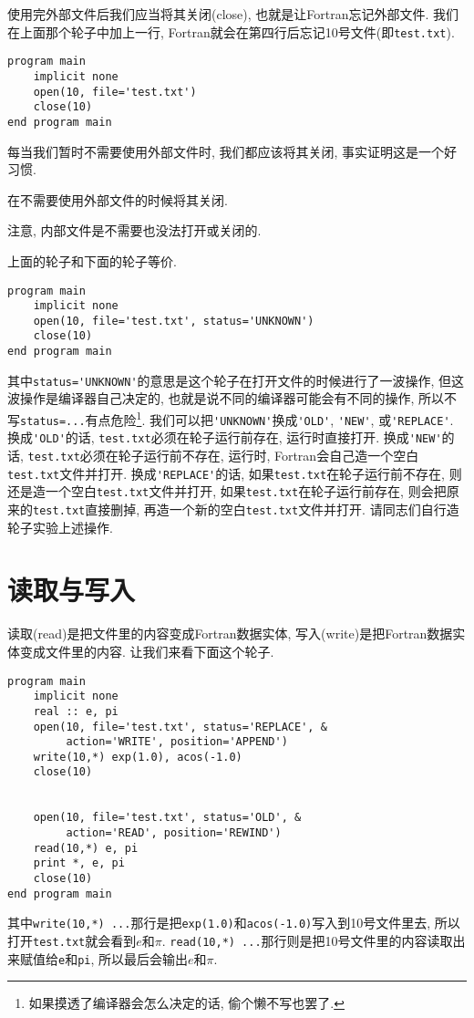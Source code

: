 使用完外部文件后我们应当将其关闭(close), 也就是让Fortran忘记外部文件. 我们在上面那个轮子中加上一行, Fortran就会在第四行后忘记10号文件(即\verb|test.txt|).
\begin{verbatim}
program main
    implicit none
    open(10, file='test.txt')
    close(10)
end program main
\end{verbatim}

每当我们暂时不需要使用外部文件时, 我们都应该将其关闭, 事实证明这是一个好习惯.

\begin{principle}
    在不需要使用外部文件的时候将其关闭.
\end{principle}

注意, 内部文件是不需要也没法打开或关闭的.

上面的轮子和下面的轮子等价.
\begin{verbatim}
program main
    implicit none
    open(10, file='test.txt', status='UNKNOWN')
    close(10)
end program main
\end{verbatim}
其中\verb|status='UNKNOWN'|的意思是这个轮子在打开文件的时候进行了一波操作, 但这波操作是编译器自己决定的, 也就是说不同的编译器可能会有不同的操作, 所以不写\verb|status=...|有点危险\footnote{如果摸透了编译器会怎么决定的话, 偷个懒不写也罢了.\label{no_add}}. 我们可以把\verb|'UNKNOWN'|换成\verb|'OLD'|, \verb|'NEW'|, 或\verb|'REPLACE'|. 换成\verb|'OLD'|的话, \verb|test.txt|必须在轮子运行前存在, 运行时直接打开. 换成\verb|'NEW'|的话, \verb|test.txt|必须在轮子运行前不存在, 运行时, Fortran会自己造一个空白\verb|test.txt|文件并打开. 换成\verb|'REPLACE'|的话, 如果\verb|test.txt|在轮子运行前不存在, 则还是造一个空白\verb|test.txt|文件并打开, 如果\verb|test.txt|在轮子运行前存在, 则会把原来的\verb|test.txt|直接删掉, 再造一个新的空白\verb|test.txt|文件并打开. 请同志们自行造轮子实验上述操作.

\section{读取与写入}

读取(read)是把文件里的内容变成Fortran数据实体, 写入(write)是把Fortran数据实体变成文件里的内容. 让我们来看下面这个轮子.
\begin{verbatim}
program main
    implicit none
    real :: e, pi
    open(10, file='test.txt', status='REPLACE', &
         action='WRITE', position='APPEND')
    write(10,*) exp(1.0), acos(-1.0)
    close(10)


    open(10, file='test.txt', status='OLD', &
         action='READ', position='REWIND')
    read(10,*) e, pi
    print *, e, pi
    close(10)
end program main
\end{verbatim}
其中\verb|write(10,*) ...|那行是把\verb|exp(1.0)|和\verb|acos(-1.0)|写入到10号文件里去, 所以打开\verb|test.txt|就会看到$e$和$\pi$. \verb|read(10,*) ...|那行则是把10号文件里的内容读取出来赋值给\verb|e|和\verb|pi|, 所以最后会输出$e$和$\pi$.

